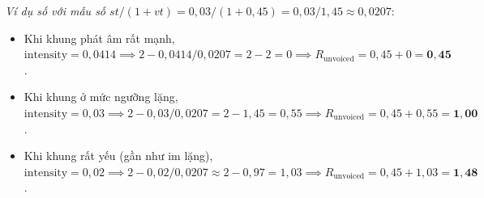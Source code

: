 \documentclass[11pt,a4paper]{article}
\begin{document}
\begin{enumerate}
    \textit{Ví dụ số với mẫu số $st / (1 + vt) = 0{,}03 / (1 + 0{,}45) = 0{,}03 / 1{,}45 \approx 0{,}0207$}:
    \begin{itemize}
        \setlength{\itemsep}{0.5pt}
        \item Khi khung phát âm rất mạnh, $\text{intensity} = 0{,}0414 \implies 2 - 0{,}0414 / 0{,}0207 = 2 - 2 = 0 \implies R_{\text{unvoiced}} = 0{,}45 + 0 = \mathbf{0{,}45}$.
        \item Khi khung ở mức ngưỡng lặng, $\text{intensity} = 0{,}03 \implies 2 - 0{,}03 / 0{,}0207 = 2 - 1{,}45 = 0{,}55 \implies R_{\text{unvoiced}} = 0{,}45 + 0{,}55 = \mathbf{1{,}00}$.
        \item Khi khung rất yếu (gần như im lặng), $\text{intensity} = 0{,}02 \implies 2 - 0{,}02 / 0{,}0207 \approx 2 - 0{,}97 = 1{,}03 \implies R_{\text{unvoiced}} = 0{,}45 + 1{,}03 = \mathbf{1{,}48}$.
    \end{itemize}
\end{enumerate}
\end{document}
